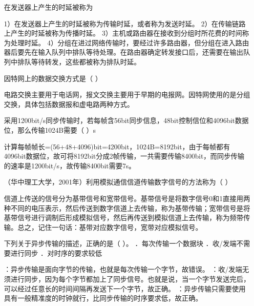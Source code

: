 \question 在发送器上产生的时延被称为
\par{}
\begin{solution}1）在发送器上产生的时延被称为传输时延，或者称为发送时延。
2）在传输链路上产生的时延被称为传播时延。
3）主机或路由器在接收到分组时所花费的时间称为处理时延。
4）分组在进过网络传输时，要经过许多路由器，但分组在进入路由器后要先在输入队列中排队等待处理。在路由器确定转发接口后，还需要在输出队列中排队等待转发，这些都被称为排队时延。
\end{solution}
\question 因特网上的数据交换方式是（ ）
\par{}
\begin{solution}电路交换主要用于电话网，报文交换主要用于早期的电报网。因特网使用的是分组交换，具体包括数据报和虚电路两种方式。
\end{solution}
\question 采用1200bit/s同步传输时，若每帧含56bit同步信息，48bit控制信位和4096bit数据位，那么传输1024B需要（
）s
\par{}
\begin{solution}计算每帧帧长=(56+48+4096)bit=4200bit，1024B=8192bit，由于每帧都有4096bit数据位，故可将8192bit分成2帧传输，一共需要传输8400bit，而同步传输的速率是1200bit/s，故传输8400bit需要7s。
\end{solution}
\question （华中理工大学，2001年）利用模拟通信信道传输数字信号的方法称为（ ）
\par{}
\begin{solution}信道上传送的信号分为基带信号和宽带信号。基带信号是将数字信号0和1直接用两种不同的电压表示，然后传送到数字信道上去传输，称为基带传输；宽带信号是将基带信号进行调制后形成模拟信号，然后再传送到模拟信道上去传输，称为频带传输。总之，记住一句话：基带对应数字信号，宽带对应模拟信号。
\end{solution}
\question 下列关于异步传输的描述，正确的是（ ）。 ．每次传输一个数据块
．收/发端不需要进行同步 ．对时序的要求较低
\par{}
\begin{solution}：异步传输是面向字节的传输，也就是每次传输一个字节，故错误。
：收/发端无须进行同步，因为每个字节都加上了同步信号。也就是说，当一个字节发送完后，可以经过任意长的时间间隔再发送下一个字节，故正确。
：异步传输只需要使用具有一般精准度的时钟就行，比同步传输的时序要求低，故正确。
\end{solution}
